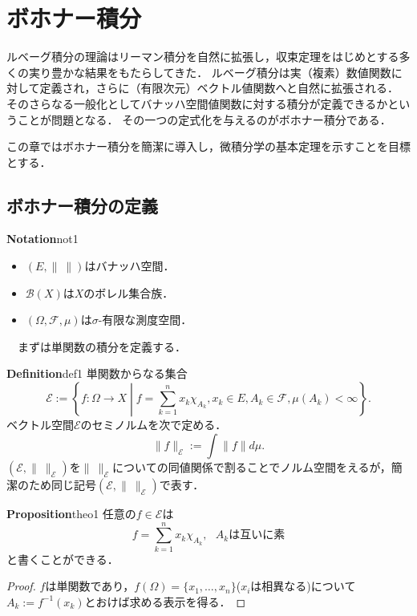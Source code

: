 \documentclass[dvipdfmx,autodetect-engine]{jbook}
\newcommand{\relmiddle}[1]{\mathrel{}\middle#1\mathrel{}}
\begin{document}
\pagestyle{fancy}
  \fancyhead{}
  \fancyhead[RO,RE]{\rightmark}
  \fancyhead[LE,LO]{\leftmark}
  \cfoot{\thepage}
  \renewcommand{\chaptermark}[1]{\markboth{第\ \thechapter\ 章~#1}{}}
  \renewcommand{\sectionmark}[1]{\markright{\thesection #1}{}}

 \chapter{ ボホナー積分}
 ルベーグ積分の理論はリーマン積分を自然に拡張し，収束定理をはじめとする多くの実り豊かな結果をもたらしてきた．
 ルベーグ積分は実（複素）数値関数に対して定義され，さらに（有限次元）ベクトル値関数へと自然に拡張される．
 そのさらなる一般化としてバナッハ空間値関数に対する積分が定義できるかということが問題となる．
 その一つの定式化を与えるのがボホナー積分である．\par
 この章ではボホナー積分を簡潔に導入し，微積分学の基本定理を示すことを目標とする．

\section{ボホナー積分の定義}
  \begin{mydef}{\textbf{Notation}}{not1}
    \begin{itemize}
      \item $(E,\|\ \|)$はバナッハ空間．
      \item $\mathcal{B}(X)$は$X$のボレル集合族．
      \item $(\Omega , \mathcal{F},\mu)$は$\sigma$-有限な測度空間．
    \end{itemize}
  \end{mydef}
　まずは単関数の積分を定義する．
  \begin{mydef}{\textbf{Definition}}{def1}
    単関数からなる集合
    \begin{equation*}
      \mathcal{E}:=\left\{ f:\Omega \to X \relmiddle| f=\sum_{k=1}^{n}x_{k}\chi_{A_k},x_k \in E , A_k \in \mathcal{F} , \mu(A_k)< \infty  \right\}.
    \end{equation*}
    ベクトル空間$\mathcal{E}$のセミノルムを次で定める．
    \begin{equation*}
      \|f\|_{\mathcal{E}}:=\int \|f\|d\mu.
    \end{equation*}
    $(\mathcal{E},\|\ \|_{\mathcal{E}})$を$\|\ \|_{\mathcal{E}}$についての同値関係で割ることでノルム空間をえるが，簡潔のため同じ記号$(\mathcal{E},\|\ \|_{\mathcal{E}})$で表す．
  \end{mydef}
  \begin{mytheo}{\textbf{Proposition}}{theo1}
    任意の$f\in \mathcal{E}$は
    \begin{equation*}
      f=\sum_{k=1}^{n}x_k \chi_{A_k},\ \ \ A_{k}は互いに素
    \end{equation*}
    と書くことができる．
  \end{mytheo}
  \begin{proof}
    $f$は単関数であり，$f(\Omega)=\{x_1,\ldots,x_n\}$($x_i$は相異なる)について$A_k:=f^{-1}(x_k)$とおけば求める表示を得る．
  \end{proof}
\end{document}
